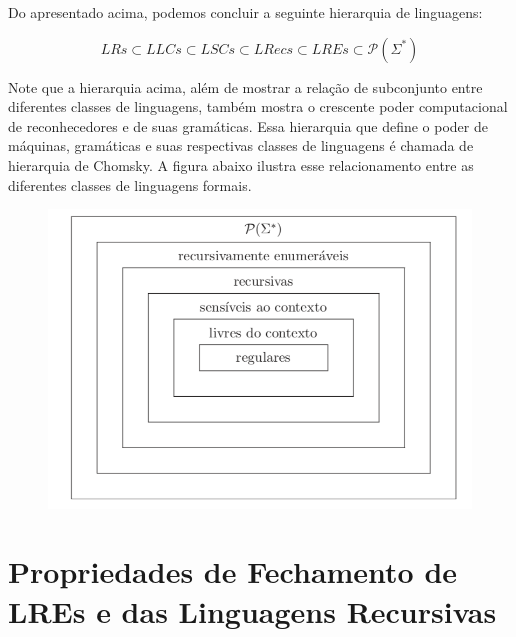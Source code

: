 \documentclass[a4paper]{article}
\theoremstyle{definition}
\begin{document}
     Do apresentado acima, podemos concluir a seguinte hierarquia de linguagens:

     \[
       LRs \subset LLCs \subset LSCs \subset LRecs \subset LREs \subset \mathcal{P}(\Sigma^*)
     \]

     Note que a hierarquia acima, além de mostrar a relação de subconjunto entre
     diferentes classes de linguagens, também mostra o crescente poder
     computacional de reconhecedores e de suas gramáticas. Essa hierarquia que
     define o poder de máquinas, gramáticas e suas respectivas classes de
     linguagens é chamada de hierarquia de Chomsky. A figura abaixo ilustra esse
     relacionamento entre as diferentes classes de linguagens formais.

       \begin{figure}[H]
         \includegraphics[scale=.3]{chomsky.png}
         \centering
       \end{figure}

       \section{Propriedades de Fechamento de LREs e das Linguagens Recursivas}
\end{document}
